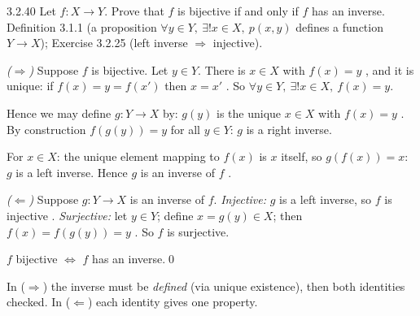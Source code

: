 \begin{bookex}[essential]{3.2.40}
Let $f:X\to Y$. Prove that $f$ is bijective if and only if $f$ has an inverse.
\solution
\given Definition 3.1.1 (a proposition $\forall y\in Y,\ \exists!x\in X,\ p(x,y)$ defines a function $Y\to X$); Exercise 3.2.25 (left inverse $\Rightarrow$ injective).
\begin{steps}
\item \emph{($\Rightarrow$)} Suppose $f$ is bijective. Let $y\in Y$. There is $x\in X$ with $f(x)=y$ , and it is unique: if $f(x)=y=f(x')$ then $x=x'$ . So $\forall y\in Y,\ \exists!x\in X,\ f(x)=y$.
\item Hence we may define $g:Y\to X$ by: $g(y)$ is the unique $x\in X$ with $f(x)=y$ . By construction $f(g(y))=y$ for all $y\in Y$: $g$ is a right inverse.
\item For $x\in X$: the unique element mapping to $f(x)$ is $x$ itself, so $g(f(x))=x$: $g$ is a left inverse. Hence $g$ is an inverse of $f$ .
\item \emph{($\Leftarrow$)} Suppose $g:Y\to X$ is an inverse of $f$. \emph{Injective:} $g$ is a left inverse, so $f$ is injective . \emph{Surjective:} let $y\in Y$; define $x=g(y)\in X$; then $f(x)=f(g(y))=y$ . So $f$ is surjective.
\end{steps}
\conclusion $f$ bijective $\Leftrightarrow$ $f$ has an inverse.\qed
\begin{compare}
\item In ($\Rightarrow$) the inverse must be \emph{defined} (via unique existence), then both identities checked. In ($\Leftarrow$) each identity gives one property.
\end{compare}
\end{bookex}

